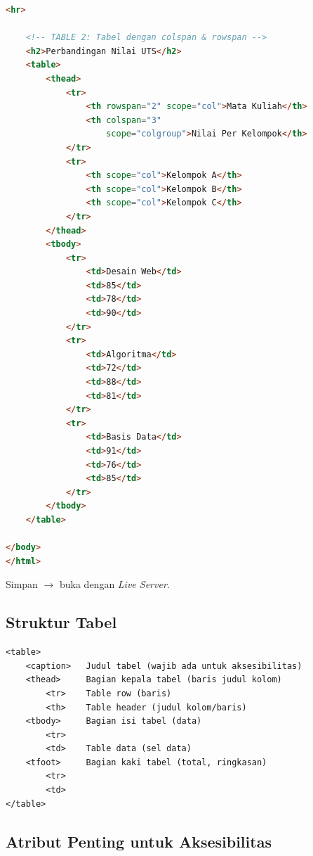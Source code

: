 \begin{lstlisting}[language=HTML, caption={Tabel data mahasiswa dengan colspan dan rowspan}, label={lst:m04-tabel}]
    <hr>

    <!-- TABLE 2: Tabel dengan colspan & rowspan -->
    <h2>Perbandingan Nilai UTS</h2>
    <table>
        <thead>
            <tr>
                <th rowspan="2" scope="col">Mata Kuliah</th>
                <th colspan="3"
                    scope="colgroup">Nilai Per Kelompok</th>
            </tr>
            <tr>
                <th scope="col">Kelompok A</th>
                <th scope="col">Kelompok B</th>
                <th scope="col">Kelompok C</th>
            </tr>
        </thead>
        <tbody>
            <tr>
                <td>Desain Web</td>
                <td>85</td>
                <td>78</td>
                <td>90</td>
            </tr>
            <tr>
                <td>Algoritma</td>
                <td>72</td>
                <td>88</td>
                <td>81</td>
            </tr>
            <tr>
                <td>Basis Data</td>
                <td>91</td>
                <td>76</td>
                <td>85</td>
            </tr>
        </tbody>
    </table>

</body>
</html>
\end{lstlisting}

Simpan $\rightarrow$ buka dengan \emph{Live Server}.

\subsection{Struktur Tabel}

\begin{lstlisting}[caption={Struktur dasar tabel HTML}, label={lst:m04-struktur-tabel}]
<table>
    <caption>   Judul tabel (wajib ada untuk aksesibilitas)
    <thead>     Bagian kepala tabel (baris judul kolom)
        <tr>    Table row (baris)
        <th>    Table header (judul kolom/baris)
    <tbody>     Bagian isi tabel (data)
        <tr>
        <td>    Table data (sel data)
    <tfoot>     Bagian kaki tabel (total, ringkasan)
        <tr>
        <td>
</table>
\end{lstlisting}

\subsection{Atribut Penting untuk Aksesibilitas}

